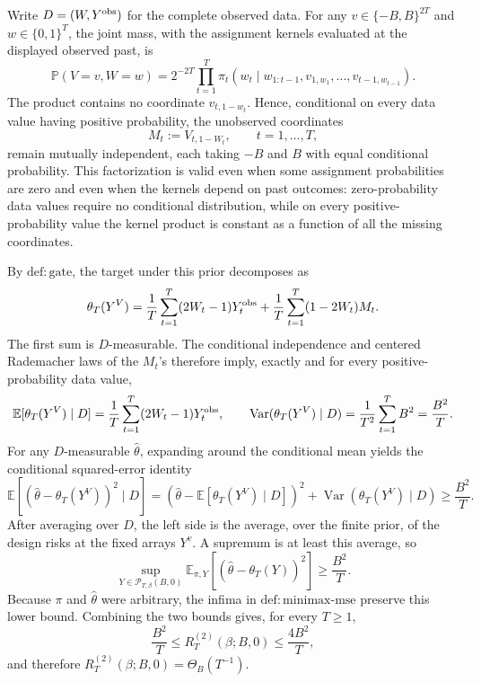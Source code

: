 Write \(D=(W,Y^{\rm obs})\) for the complete observed data.  For any \(v\in\{-B,B\}^{2T}\) and \(w\in\{0,1\}^T\), the joint mass, with the assignment kernels evaluated at the displayed observed past, is
\[
 \mathbb P(V=v,W=w)
 =2^{-2T}\prod_{t=1}^T
 \pi_t\!\left(w_t\mid
 w_{1:t-1},v_{1,w_1},\ldots,v_{t-1,w_{t-1}}\right).
\]
The product contains no coordinate \(v_{t,1-w_t}\).  Hence, conditional on every data value having positive probability, the unobserved coordinates
\[
 M_t:=V_{t,1-W_t},\qquad t=1,\ldots,T,
\]
remain mutually independent, each taking \(-B\) and \(B\) with equal conditional probability.  This factorization is valid even when some assignment probabilities are zero and even when the kernels depend on past outcomes: zero-probability data values require no conditional distribution, while on every positive-probability value the kernel product is constant as a function of all the missing coordinates.

By \(\mathrm{def{:}gate}\), the target under this prior decomposes as
\[
 \theta_T(Y^V)
 =\frac1T\sum_{t=1}^T(2W_t-1)Y_t^{\rm obs}
 +\frac1T\sum_{t=1}^T(1-2W_t)M_t.
\]
The first sum is \(D\)-measurable.  The conditional independence and centered Rademacher laws of the \(M_t\)'s therefore imply, exactly and for every positive-probability data value,
\[
 \mathbb E[\theta_T(Y^V)\mid D]
 =\frac1T\sum_{t=1}^T(2W_t-1)Y_t^{\rm obs},
 \qquad
 \operatorname{Var}(\theta_T(Y^V)\mid D)
 =\frac1{T^2}\sum_{t=1}^T B^2
 =\frac{B^2}{T}.
\]
For any \(D\)-measurable \(\widehat\theta\), expanding around the conditional mean yields the conditional squared-error identity
\[
 \mathbb E\!\left[(\widehat\theta-\theta_T(Y^V))^2\mid D\right]
 =\left(\widehat\theta-\mathbb E[\theta_T(Y^V)\mid D]\right)^2
 +\operatorname{Var}(\theta_T(Y^V)\mid D)
 \ge \frac{B^2}{T}.
\]
After averaging over \(D\), the left side is the average, over the finite prior, of the design risks at the fixed arrays \(Y^v\).  A supremum is at least this average, so
\[
 \sup_{Y\in\mathcal P_{T,\beta}(B,0)}
 \mathbb E_{\pi,Y}[(\widehat\theta-\theta_T(Y))^2]
 \ge \frac{B^2}{T}.
\]
Because \(\pi\) and \(\widehat\theta\) were arbitrary, the infima in \(\mathrm{def{:}minimax\mbox{-}mse}\) preserve this lower bound.  Combining the two bounds gives, for every \(T\ge1\),
\[
 \frac{B^2}{T}\le R_T^{(2)}(\beta;B,0)\le\frac{4B^2}{T},
\]
and therefore \(R_T^{(2)}(\beta;B,0)=\Theta_B(T^{-1})\).
